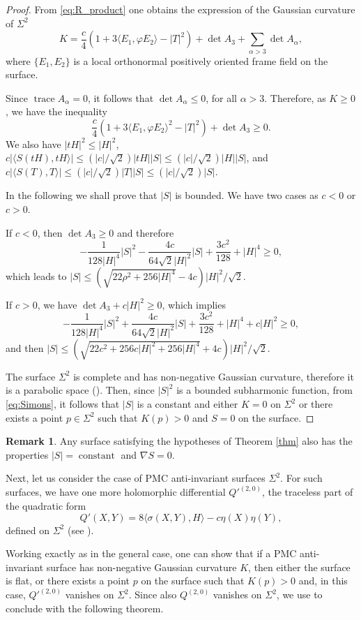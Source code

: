 \documentclass[11pt]{amsart}
\theoremstyle{plain}
\theoremstyle{definition}
\newtheorem{remark}       [theorem]  {Remark}
\DeclareMathOperator{\trace}{trace} \DeclareMathOperator{\di}{div}
\DeclareMathOperator{\cst}{constant}
\numberwithin{equation}{section}
\begin{document}
\begin{proof}
From \eqref{eq:R_product} one obtains the expression of the Gaussian curvature of $\Sigma^2$
\begin{equation}\label{K}
K=\frac{c}{4}(1+3\langle E_1,\varphi E_2\rangle-|T|^2)+\det A_3+\sum_{\alpha>3}\det A_{\alpha},
\end{equation}
where $\{E_1,E_2\}$ is a local orthonormal positively oriented frame field on the surface.


Since $\trace A_{\alpha}=0$, it follows that $\det A_{\alpha}\leq 0$, for all $\alpha>3$. Therefore, as $K\geq 0$, we have the inequality
$$
\frac{c}{4}(1+3\langle E_1,\varphi E_2\rangle^2-|T|^2)+\det A_3\geq 0.
$$
We also have $|tH|^2\leq|H|^2$, $c|\langle S(tH),tH\rangle|\leq(|c|/\sqrt{2})|tH||S|\leq(|c|/\sqrt{2})|H||S|$, and $c|\langle S(T),T\rangle|\leq(|c|/\sqrt{2})|T||S|\leq(|c|/\sqrt{2})|S|$.


In the following we shall prove that $|S|$ is bounded. We have two cases as $c<0$ or $c>0$.

If $c<0$, then $\det A_3\geq 0$ and therefore
$$
-\frac{1}{128|H|^4}|S|^2-\frac{4c}{64\sqrt{2}|H|^2}|S|+\frac{3c^2}{128}+|H|^4\geq 0,
$$
which leads to $|S|\leq(\sqrt{22\rho^2+256|H|^4}-4c)|H|^2/\sqrt{2}$.

If $c>0$, we have $\det A_3+c|H|^2\geq 0$, which implies
$$
-\frac{1}{128|H|^4}|S|^2+\frac{4c}{64\sqrt{2}|H|^2}|S|+\frac{3c^2}{128}+|H|^4+c|H|^2\geq 0,
$$
and then $|S|\leq(\sqrt{22c^2+256c|H|^2+256|H|^4}+4c)|H|^2/\sqrt{2}$.

The surface $\Sigma^2$ is complete and has non-negative Gaussian curvature, therefore it is a parabolic space (\cite{H}). Then, since $|S|^2$ is a bounded subharmonic function, from \eqref{eq:Simons}, it follows that $|S|$ is a constant and either $K=0$ on $\Sigma^2$ or there exists a point $p\in\Sigma^2$ such that $K(p)>0$ and $S=0$ on the surface.
\end{proof}

\begin{remark}\label{r_thm} Any surface satisfying the hypotheses of Theorem \ref{thm} also has the properties $|S|=\cst$ and $\nabla S=0$.
\end{remark}

Next, let us consider the case of PMC anti-invariant surfaces $\Sigma^2$. For such surfaces, we have one more holomorphic differential $Q'^{(2,0)}$, the traceless part of the quadratic form
$$
Q'(X,Y)=8\langle\sigma(X,Y),H\rangle-c\eta(X)\eta(Y),
$$
defined on $\Sigma^2$ (see \cite{FR-TAMS}).

Working exactly as in the general case, one can show that if a PMC anti-invariant surface has non-negative Gaussian curvature $K$, then either the surface is flat, or there exists a point $p$ on the surface such that $K(p)>0$ and, in this case, $Q'^{(2,0)}$ vanishes on $\Sigma^2$. Since also $Q^{(2,0)}$ vanishes on $\Sigma^2$, we use \cite[Corollaries 6.5, 6.10]{FR-TAMS} to conclude with the following theorem.
\end{document}
